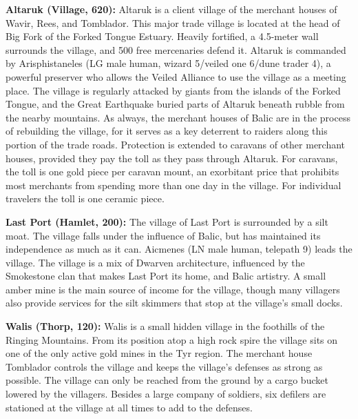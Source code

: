 {
	\textbf{Altaruk (Village, 620):} Altaruk is a client village of the merchant houses of Wavir, Rees, and Tomblador. This major trade village is located at the head of Big Fork of the Forked Tongue Estuary. Heavily fortified, a 4.5-meter wall surrounds the village, and 500 free mercenaries defend it. Altaruk is commanded by Arisphistaneles (LG male human, wizard 5/veiled one 6/dune trader 4), a powerful preserver who allows the Veiled Alliance to use the village as a meeting place. The village is regularly attacked by giants from the islands of the Forked Tongue, and the Great Earthquake buried parts of Altaruk beneath rubble from the nearby mountains. As always, the merchant houses of Balic are in the process of rebuilding the village, for it serves as a key deterrent to raiders along this portion of the trade roads. Protection is extended to caravans of other merchant houses, provided they pay the toll as they pass through Altaruk. For caravans, the toll is one gold piece per caravan mount, an exorbitant price that prohibits most merchants from spending more than one day in the village. For individual travelers the toll is one ceramic piece.

	\textbf{Last Port (Hamlet, 200):} The village of Last Port is surrounded by a silt moat. The village falls under the influence of Balic, but has maintained its independence as much as it can. Aicmenes (LN male human, telepath 9) leads the village. The village is a mix of Dwarven architecture, influenced by the Smokestone clan that makes Last Port its home, and Balic artistry. A small amber mine is the main source of income for the village, though many villagers also provide services for the silt skimmers that stop at the village's small docks.

	\textbf{Walis (Thorp, 120):} Walis is a small hidden village in the foothills of the Ringing Mountains. From its position atop a high rock spire the village sits on one of the only active gold mines in the Tyr region. The merchant house Tomblador controls the village and keeps the village's defenses as strong as possible. The village can only be reached from the ground by a cargo bucket lowered by the villagers. Besides a large company of soldiers, six defilers are stationed at the village at all times to add to the defenses.
}
